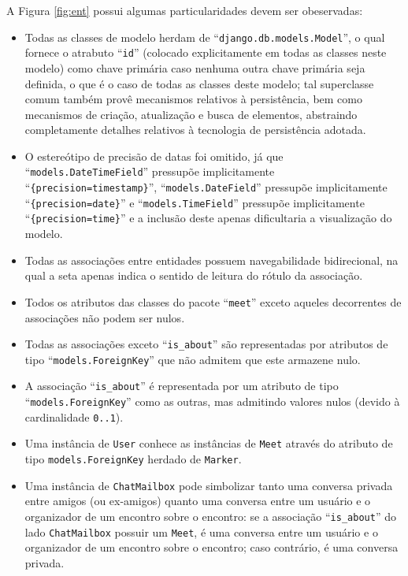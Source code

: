 A Figura \ref{fig:ent} possui algumas particularidades devem ser obeservadas:
\begin{itemize}
  \item Todas as classes de modelo herdam de ``\texttt{django.db.models.Model}'', o qual fornece o atrabuto ``\texttt{id}'' (colocado explicitamente em todas as classes neste modelo) como chave primária caso nenhuma outra chave primária seja definida, o que é o caso de todas as classes deste modelo; tal superclasse comum também provê mecanismos relativos à persistência, bem como mecanismos de criação, atualização e busca de elementos, abstraindo completamente detalhes relativos à tecnologia de persistência adotada.
  \item O estereótipo de precisão de datas foi omitido, já que ``\texttt{models.DateTimeField}'' pressupõe implicitamente ``\texttt{\{precision=timestamp\}}'', ``\texttt{models.DateField}'' pressupõe implicitamente ``\texttt{\{precision=date\}}'' e ``\texttt{models.TimeField}'' pressupõe implicitamente ``\texttt{\{precision=time\}}'' e a inclusão deste apenas dificultaria a visualização do modelo.
  \item Todas as associações entre entidades possuem navegabilidade bidirecional, na qual a seta apenas indica o sentido de leitura do rótulo da associação.
  \item Todos os atributos das classes do pacote ``\texttt{meet}'' exceto aqueles decorrentes de associações não podem ser nulos.
  \item Todas as associações exceto ``\texttt{is\_about}'' são representadas por atributos de tipo ``\texttt{models.ForeignKey}'' que não admitem que este armazene nulo.
  \item A associação ``\texttt{is\_about}'' é representada por um atributo de tipo ``\texttt{models.ForeignKey}'' como as outras, mas admitindo valores nulos (devido \`{a} cardinalidade \texttt{0..1}).
  \item Uma instância de \texttt{User} conhece as instâncias de \texttt{Meet} através do atributo de tipo \texttt{models.ForeignKey} herdado de \texttt{Marker}.
  \item Uma instância de \texttt{ChatMailbox} pode simbolizar tanto uma conversa privada entre amigos (ou ex-amigos) quanto uma conversa entre um usuário e o organizador de um encontro sobre o encontro: se a associação ``\texttt{is\_about}'' do lado \texttt{ChatMailbox} possuir um \texttt{Meet}, é uma conversa entre um usuário e o organizador de um encontro sobre o encontro; caso contrário, é uma conversa privada.

\end{itemize}
